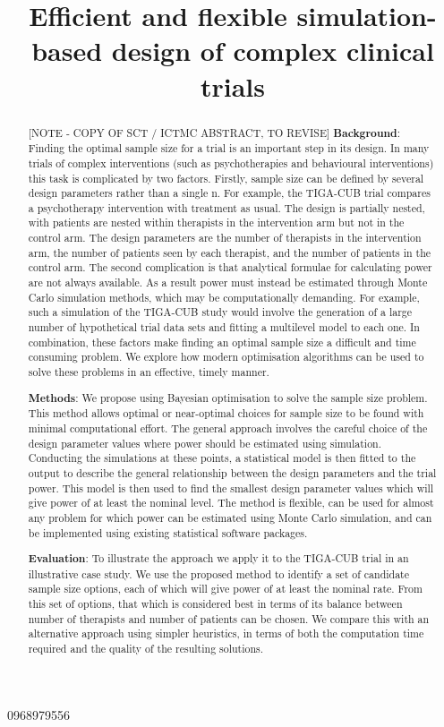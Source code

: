 \documentclass{article} %
\title{Efficient and flexible simulation-based design of complex clinical trials}
\date{}
\begin{document}
0968979556
\maketitle

\begin{abstract}
[NOTE - COPY OF SCT / ICTMC ABSTRACT, TO REVISE] \textbf{Background}: Finding the optimal sample size for a trial is an important step in its design. In many trials of complex interventions (such as psychotherapies and behavioural interventions) this task is complicated by two factors. Firstly, sample size can be defined by several design parameters rather than a single n. For example, the TIGA-CUB trial compares a psychotherapy intervention with treatment as usual. The design is partially nested, with patients are nested within therapists in the intervention arm but not in the control arm. The design parameters are the number of therapists in the intervention arm, the number of patients seen by each therapist, and the number of patients in the control arm. The second complication is that analytical formulae for calculating power are not always available. As a result power must instead be estimated through Monte Carlo simulation methods, which may be computationally demanding. For example, such a simulation of the TIGA-CUB study would involve the generation of a large number of hypothetical trial data sets and fitting a multilevel model to each one. In combination, these factors make finding an optimal sample size a difficult and time consuming problem. We explore how modern optimisation algorithms can be used to solve these problems in an effective, timely manner.

\textbf{Methods}: We propose using Bayesian optimisation to solve the sample size problem. This method allows optimal or near-optimal choices for sample size to be found with minimal computational effort. The general approach involves the careful choice of the design parameter values where power should be estimated using simulation. Conducting the simulations at these points, a statistical model is then fitted to the output to describe the general relationship between the design parameters and the trial power. This model is then used to find the smallest design parameter values which will give power of at least the nominal level. The method is flexible, can be used for almost any problem for which power can be estimated using Monte Carlo simulation, and can be implemented using existing statistical software packages.

\textbf{Evaluation}: To illustrate the approach we apply it to the TIGA-CUB trial in an illustrative case study. We use the proposed method to identify a set of candidate sample size options, each of which will give power of at least the nominal rate. From this set of options, that which is considered best in terms of its balance between number of therapists and number of patients can be chosen. We compare this with an alternative approach using simpler heuristics, in terms of both the computation time required and the quality of the resulting solutions.


\end{abstract}
\end{document}
